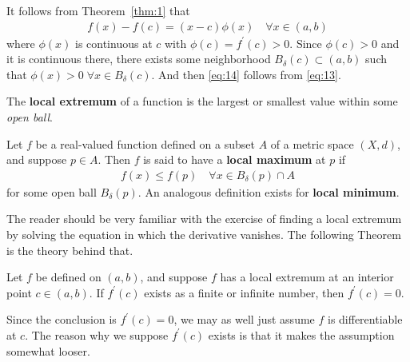 \documentclass[thmcnt=section, 12pt]{my-elegantbook}
\begin{document}
\begin{solution}
    It follows from Theorem~\ref{thm:1} that 
    \begin{align}
        f(x) - f(c) = (x - c) \phi(x)
        \quad \forall x \in (a, b)
        \label{eq:13}
    \end{align}
    where $\phi(x)$ is continuous at $c$ with $\phi(c) = f^\prime(c) > 0$. Since $\phi(c) > 0$ and it is continuous there, there exists some neighborhood $B_\delta(c) \subset (a, b)$ such that $\phi(x) > 0 \; \forall x \in B_\delta(c)$. And then \eqref{eq:14} follows from \eqref{eq:13}.
\end{solution}


\par The \textbf{local extremum} of a function is the largest or smallest value within some \textit{open ball}.

\begin{definition}
    Let $f$ be a real-valued function defined on a subset $A$ of a metric space $(X, d)$, and suppose $p \in A$. Then $f$ is said to have a \textbf{local maximum} at $p$ if 
    \begin{align*}
        f(x) \leq f(p)
        \quad \forall x \in B_\delta(p) \cap A
    \end{align*} 
    for some open ball $B_\delta(p)$. An analogous definition exists for \textbf{local minimum}.
\end{definition}


\par The reader should be very familiar with the exercise of finding a local extremum by solving the equation in which the derivative vanishes. The following Theorem is the theory behind that.

\begin{theorem} \label{thm:5}
    Let $f$ be defined on $(a, b)$, and suppose $f$ has a local extremum at an interior point $c \in (a, b)$. If $f^\prime(c)$ exists as a finite or infinite number, then $f^\prime(c) = 0$.
\end{theorem}

\begin{remark}
    Since the conclusion is $f^\prime(c) = 0$, we may as well just assume $f$ is differentiable at $c$. The reason why we suppose $f^\prime(c)$ exists is that it makes the assumption somewhat looser.
\end{remark}
\end{document}
